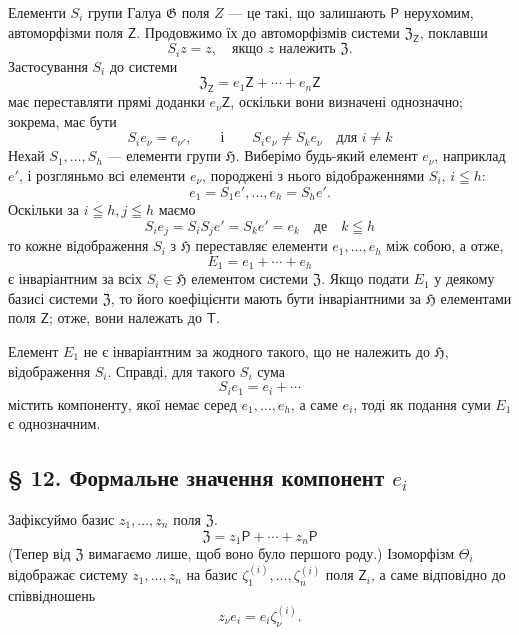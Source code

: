 \documentclass[11pt]{article}
\begin{document}
Елементи \(S_i\) групи Галуа \(\mathfrak G\) поля \(Z\) --- це такі, що залишають \(\mathsf P\) нерухомим, автоморфізми поля \(\mathsf Z\). Продовжимо їх до автоморфізмів системи \(\mathfrak Z_{\mathsf Z}\), поклавши
\[
S_i z=z,\quad \text{якщо } z \text{ належить } \mathfrak Z.
\]
Застосування \(S_i\) до системи
\[
\mathfrak Z_{\mathsf Z}=e_1\mathsf Z+\cdots+e_n\mathsf Z
\]
має переставляти прямі доданки \(e_\nu\mathsf Z\), оскільки вони визначені однозначно; зокрема, має бути
\[
S_i e_\nu=e_{\nu'},\qquad\text{і}\qquad S_i e_\nu\ne S_k e_\nu
\quad\text{для } i\ne k
\]
Нехай \(S_1,\ldots,S_h\) --- елементи групи \(\mathfrak H\). Виберімо будь-який елемент \(e_\nu\), наприклад \(e'\), і розгляньмо всі елементи \(e_\nu\), породжені з нього відображеннями \(S_i\), \(i\leqq h\):
\[
e_1=S_1e',\ldots,e_h=S_he'.
\]
Оскільки за \(i\leqq h, j\leqq h\) маємо
\[
S_i e_j=S_iS_j e'=S_ke'=e_k \quad \text{де}\quad k\leqq h
\]
то кожне відображення \(S_i\) з \(\mathfrak H\) переставляє елементи \(e_1,\ldots,e_h\) між собою, а отже,
\[
E_1=e_1+\cdots+e_h
\]
є інваріантним за всіх \(S_i\in\mathfrak H\) елементом системи \(\mathfrak Z\). Якщо подати \(E_1\) у деякому базисі системи \(\mathfrak Z\), то його коефіцієнти мають бути інваріантними за \(\mathfrak H\) елементами поля \(\mathsf Z\); отже, вони належать до \(\mathsf T\).

Елемент \(E_1\) не є інваріантним за жодного такого, що не належить до \(\mathfrak H\), відображення \(S_i\). Справді, для такого \(S_i\) сума
\[
S_i e_1=e_i+\cdots
\]
містить компоненту, якої немає серед \(e_1,\ldots,e_h\), а саме \(e_i\), тоді як подання суми \(E_1\) є однозначним.

\subsection*{§ 12. Формальне значення компонент \(e_i\)}\label{die-formale-bedeutung-der-komponenten-ei}

Зафіксуймо базис \(z_1,\ldots,z_n\) поля \(\mathfrak Z\).
\[
\mathfrak Z=z_1\mathsf P+\cdots+z_n\mathsf P
\]
(Тепер від \(\mathfrak Z\) вимагаємо лише, щоб воно було першого роду.) Ізоморфізм \(\Theta_i\) відображає систему \(z_1,\ldots,z_n\) на базис \(\zeta_1^{(i)},\ldots,\zeta_n^{(i)}\) поля \(\mathsf Z_i\), а саме відповідно до співвідношень
\[
z_\nu e_i=e_i\zeta_\nu^{(i)} .
\]
\end{document}

